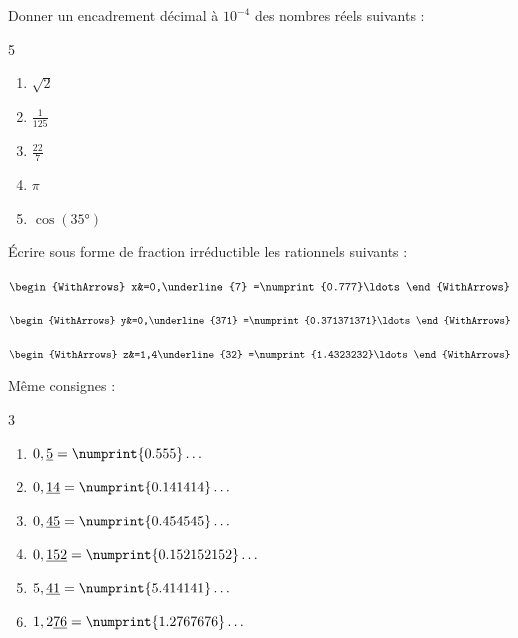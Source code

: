 \documentclass[main.tex]{subfiles}
\begin{document}
\begin{exercise}Donner un encadrement décimal à $10^{-4}$ des nombres réels suivants :\vspace{-1em}
	\begin{multicols}{5} 
		\begin{enumerate}[label={\alph*)\rule{0pt}{1.5em}},leftmargin=*]
			\item $\sqrt{2}$
			\item $\tfrac{1}{125}$
			\item $\tfrac{22}{7}$
			\item $\pi$
			\item $\cos(\ang{35})$ 
		\end{enumerate}
	\end{multicols}  
\end{exercise}
 

\begin{example} Écrire sous forme de fraction irréductible les rationnels suivants :\\
	\noindent \parbox{0.25\linewidth}{	
		$\begin{WithArrows}
			x&=0,\underline{7}  =\numprint{0.777}\ldots 
		\end{WithArrows}$ 	
	}\hfill \parbox{0.3\linewidth}{	
		$\begin{WithArrows}
			y&=0,\underline{371}  =\numprint{0.371371371}\ldots  
		\end{WithArrows}$ 	
	}\hfill \parbox{0.3\linewidth}{	
		$\begin{WithArrows}
			z&=1,4\underline{32}  =\numprint{1.4323232}\ldots  
		\end{WithArrows}$ 	
	} 
\end{example}
\vfill 
\begin{exercise} \label{chapter02:exercice:miseenequation00} Même consignes : 
	\vspace{-1em}
	\begin{multicols}{3}
		\begin{enumerate}[label={$\alph*=$}, leftmargin=*]
			\item $0,\underline{5}=\numprint{0.555}\ldots$  
			\item $0,\underline{14}=\numprint{0.141414}\ldots$ 
			\item $0,\underline{45}=\numprint{0.454545}\ldots$ 
			\item $0,\underline{152}=\numprint{0.152152152}\ldots$  
			\item $5,\underline{41}=\numprint{5.414141}\ldots$ 
			\item $1,2\underline{76}=\numprint{1.2767676}\ldots$ 
		\end{enumerate}
	\end{multicols}  
\end{exercise}  
 
\end{document}
